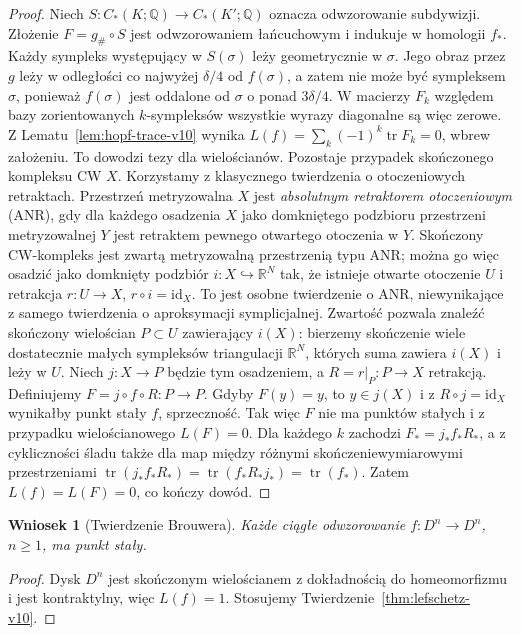 \documentclass[11pt,a4paper,oneside]{report}
\newcommand{\R}{\mathbb{R}}
\newcommand{\Q}{\mathbb{Q}}
\newcommand{\id}{\mathrm{id}}
\theoremstyle{plain}
\newtheorem{wniosek}[twierdzenie]{Wniosek}
\theoremstyle{definition}
\theoremstyle{remark}
\begin{document}
\begin{proof}
Niech $S:C_*(K;\Q)\to C_*(K';\Q)$ oznacza odwzorowanie
subdywizji. Złożenie $F=g_\#\circ S$ jest
odwzorowaniem łańcuchowym i indukuje w homologii
$f_*$. Każdy sympleks występujący w $S(\sigma)$
leży geometrycznie w $\sigma$. Jego obraz przez $g$
leży w odległości co najwyżej $\delta/4$ od
$f(\sigma)$, a zatem nie może być sympleksem $\sigma$,
ponieważ $f(\sigma)$ jest oddalone od $\sigma$
o ponad $3\delta/4$. W macierzy $F_k$ względem
bazy zorientowanych $k$-sympleksów wszystkie wyrazy
diagonalne są więc zerowe. Z Lematu~\ref{lem:hopf-trace-v10}
wynika $L(f)=\sum_k(-1)^k\operatorname{tr}F_k=0$,
wbrew założeniu. To dowodzi tezy dla wielościanów.
Pozostaje przypadek skończonego kompleksu CW $X$.
Korzystamy z klasycznego twierdzenia o otoczeniowych
retraktach. Przestrzeń metryzowalna $X$ jest \emph{absolutnym
retraktorem otoczeniowym} (ANR), gdy dla każdego
osadzenia $X$ jako domkniętego podzbioru przestrzeni
metryzowalnej $Y$ jest retraktem pewnego otwartego
otoczenia w $Y$. Skończony CW-kompleks jest zwartą
metryzowalną przestrzenią typu ANR; można go więc osadzić
jako domknięty podzbiór $i:X\hookrightarrow\R^N$
tak, że istnieje otwarte otoczenie $U$ i retrakcja
$r:U\to X$, $r\circ i=\id_X$. To jest osobne twierdzenie
o ANR, niewynikające z samego twierdzenia o aproksymacji
symplicjalnej.
Zwartość pozwala znaleźć skończony wielościan
$P\subset U$ zawierający $i(X)$: bierzemy skończenie
wiele dostatecznie małych sympleksów triangulacji
$\R^N$, których suma zawiera $i(X)$ i leży w $U$.
Niech $j:X\to P$ będzie tym osadzeniem, a
$R=r|_P:P\to X$ retrakcją. Definiujemy
$F=j\circ f\circ R:P\to P$.
Gdyby $F(y)=y$, to $y\in j(X)$ i z $R\circ j=\id_X$
wynikałby punkt stały $f$, sprzeczność.
Tak więc $F$ nie ma punktów stałych i z przypadku
wielościanowego $L(F)=0$.
Dla każdego $k$ zachodzi $F_*=j_* f_*R_*$,
a z cykliczności śladu także dla map między różnymi
skończeniewymiarowymi przestrzeniami
$\operatorname{tr}(j_*f_*R_*)=
\operatorname{tr}(f_*R_*j_*)=\operatorname{tr}(f_*)$.
Zatem $L(f)=L(F)=0$, co kończy dowód.
\end{proof}

\begin{wniosek}[Twierdzenie Brouwera]
Każde ciągłe odwzorowanie $f:D^n\to D^n$, $n\ge1$,
ma punkt stały.
\end{wniosek}
\begin{proof}
Dysk $D^n$ jest skończonym wielościanem z dokładnością
do homeomorfizmu i jest kontraktylny, więc
$L(f)=1$. Stosujemy Twierdzenie~\ref{thm:lefschetz-v10}.
\end{proof}
\end{document}
